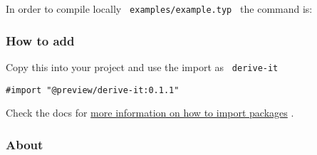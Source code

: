 \begin{Shaded}
\begin{Highlighting}[]
\NormalTok{))}
\end{Highlighting}
\end{Shaded}

In order to compile locally \texttt{\ examples/example.typ\ } the
command is:

\begin{Shaded}
\begin{Highlighting}[]
\end{Highlighting}
\end{Shaded}

\subsubsection{How to add}\label{how-to-add}

Copy this into your project and use the import as \texttt{\ derive-it\ }

\begin{verbatim}
#import "@preview/derive-it:0.1.1"
\end{verbatim}



Check the docs for
\href{https://typst.app/docs/reference/scripting/\#packages}{more
information on how to import packages} .

\subsubsection{About}\label{about}

